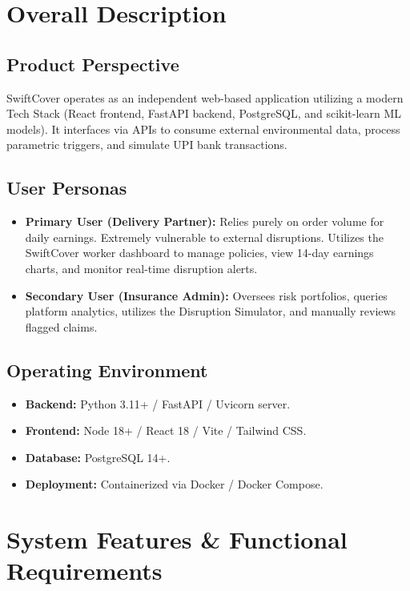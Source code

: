 \documentclass[12pt,a4paper]{article}
\begin{document}
\section{Overall Description}

\subsection{Product Perspective}
SwiftCover operates as an independent web-based application utilizing a modern Tech Stack (React frontend, FastAPI backend, PostgreSQL, and scikit-learn ML models). It interfaces via APIs to consume external environmental data, process parametric triggers, and simulate UPI bank transactions. 

\subsection{User Personas}
\begin{itemize}
    \item \textbf{Primary User (Delivery Partner):} Relies purely on order volume for daily earnings. Extremely vulnerable to external disruptions. Utilizes the SwiftCover worker dashboard to manage policies, view 14-day earnings charts, and monitor real-time disruption alerts.
    \item \textbf{Secondary User (Insurance Admin):} Oversees risk portfolios, queries platform analytics, utilizes the Disruption Simulator, and manually reviews flagged claims.
\end{itemize}

\subsection{Operating Environment}
\begin{itemize}
    \item \textbf{Backend:} Python 3.11+ / FastAPI / Uvicorn server.
    \item \textbf{Frontend:} Node 18+ / React 18 / Vite / Tailwind CSS.
    \item \textbf{Database:} PostgreSQL 14+.
    \item \textbf{Deployment:} Containerized via Docker / Docker Compose.
\end{itemize}

\section{System Features \& Functional Requirements}
\end{document}
